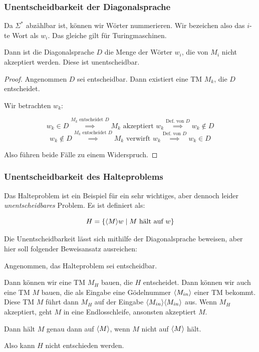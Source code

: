 \documentclass[a4paper,parskip=half*,DIV=7,fontsize=11pt]{scrartcl}
\DeclarePairedDelimiter\goedel{\langle}{\rangle}
\begin{document}
\subsubsection{Unentscheidbarkeit der Diagonalsprache}

Da $\Sigma^\ast$ abzählbar ist, können wir Wörter nummerieren. Wir bezeichen also das $i$-te Wort als $w_i$. Das gleiche gilt für Turingmaschinen.

Dann ist die Diagonalsprache $D$ die Menge der Wörter $w_i$, die von $M_i$ nicht akzeptiert werden. Diese ist unentscheidbar.

\begin{proof}
Angenommen $D$ sei entscheidbar. Dann existiert eine TM $M_k$, die $D$ entscheidet.

Wir betrachten $w_k$:

\[w_k \in D \overset{M_k \text{ entscheidet } D}{\implies} M_k \text{ akzeptiert } w_k \overset{\text{Def. von } D}{\implies} w_k \notin D \]
\[w_k \notin D \overset{M_k \text{ entscheidet } D}{\implies} M_k \text{ verwirft } w_k \overset{\text{Def. von } D}{\implies} w_k \in D \]

Also führen beide Fälle zu einem Widerspruch.
\end{proof}

\subsubsection{Unentscheidbarkeit des Halteproblems}
Das Halteproblem ist ein Beispiel für ein sehr wichtiges, aber dennoch leider \emph{unentscheidbares} Problem.  Es ist definiert als:

\[H = \{\goedel{M} w \mid \text{$M$ hält auf $w$}\}\]

Die Unentscheidbarkeit lässt sich mithilfe der Diagonalsprache beweisen, aber hier soll folgender Beweisansatz ausreichen:

Angenommen, das Halteproblem sei entscheidbar. 

Dann können wir eine TM $M_H$ bauen, die $H$ entscheidet. Dann können wir auch eine TM $M$ bauen, die als Eingabe eine Gödelnummer $\goedel{M_{in}}$ einer TM bekommt. Diese TM $M$ führt dann $M_H$ auf der Eingabe $\goedel{M_{in}}\goedel{M_{in}}$ aus. Wenn $M_H$ akzeptiert, geht $M$ in eine Endlosschleife, ansonsten akzeptiert $M$.

Dann hält $M$ genau dann auf $\goedel{M}$, wenn $M$ nicht auf $\goedel{M}$ hält.

Also kann $H$ nicht entschieden werden.
\end{document}
